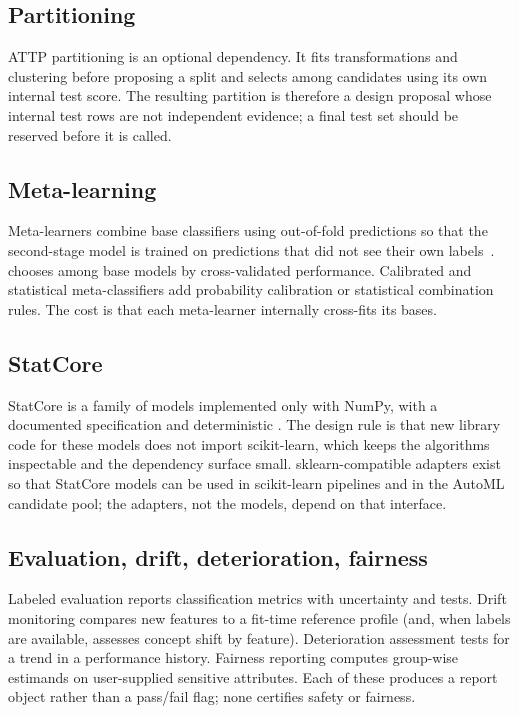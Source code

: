 \documentclass[conference]{IEEEtran}
\begin{document}
\subsection{Partitioning}
ATTP partitioning is an optional dependency. It fits transformations and clustering before proposing a split and selects among candidates using its own internal test score. The resulting partition is therefore a design proposal whose internal test rows are not independent evidence; a final test set should be reserved before it is called.

\subsection{Meta-learning}
Meta-learners combine base classifiers using out-of-fold predictions so that the second-stage model is trained on predictions that did not see their own labels~\cite{wolpert1992,breiman1996}.  chooses among base models by cross-validated performance. Calibrated and statistical meta-classifiers add probability calibration or statistical combination rules. The cost is that each meta-learner internally cross-fits its bases.

\subsection{StatCore}
StatCore is a family of models implemented only with NumPy, with a documented specification and deterministic . The design rule is that new library code for these models does not import scikit-learn, which keeps the algorithms inspectable and the dependency surface small. sklearn-compatible adapters exist so that StatCore models can be used in scikit-learn pipelines and in the AutoML candidate pool; the adapters, not the models, depend on that interface.

\subsection{Evaluation, drift, deterioration, fairness}
Labeled evaluation reports classification metrics with uncertainty and tests. Drift monitoring compares new features to a fit-time reference profile (and, when labels are available, assesses concept shift by feature). Deterioration assessment tests for a trend in a performance history. Fairness reporting computes group-wise estimands on user-supplied sensitive attributes. Each of these produces a report object rather than a pass/fail flag; none certifies safety or fairness.
\end{document}
